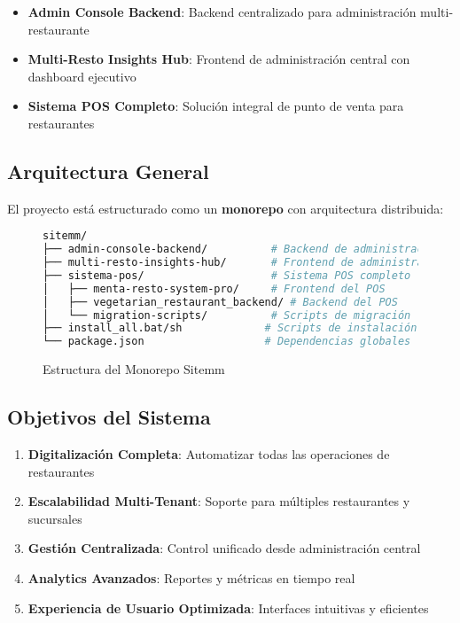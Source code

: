 \documentclass[12pt,a4paper]{article}
\begin{document}
\begin{itemize}
    \item \textbf{Admin Console Backend}: Backend centralizado para administración multi-restaurante
    \item \textbf{Multi-Resto Insights Hub}: Frontend de administración central con dashboard ejecutivo
    \item \textbf{Sistema POS Completo}: Solución integral de punto de venta para restaurantes
\end{itemize}

\subsection{Arquitectura General}

El proyecto está estructurado como un \textbf{monorepo} con arquitectura distribuida:

\begin{figure}[H]
\centering
\begin{lstlisting}[language=bash]
sitemm/
├── admin-console-backend/          # Backend de administración central
├── multi-resto-insights-hub/       # Frontend de administración central  
├── sistema-pos/                    # Sistema POS completo
│   ├── menta-resto-system-pro/     # Frontend del POS
│   ├── vegetarian_restaurant_backend/ # Backend del POS
│   └── migration-scripts/          # Scripts de migración
├── install_all.bat/sh             # Scripts de instalación automática
└── package.json                   # Dependencias globales
\end{lstlisting}
\caption{Estructura del Monorepo Sitemm}
\end{figure}

\subsection{Objetivos del Sistema}

\begin{enumerate}
    \item \textbf{Digitalización Completa}: Automatizar todas las operaciones de restaurantes
    \item \textbf{Escalabilidad Multi-Tenant}: Soporte para múltiples restaurantes y sucursales
    \item \textbf{Gestión Centralizada}: Control unificado desde administración central
    \item \textbf{Analytics Avanzados}: Reportes y métricas en tiempo real
    \item \textbf{Experiencia de Usuario Optimizada}: Interfaces intuitivas y eficientes
\end{enumerate}
\end{document}
